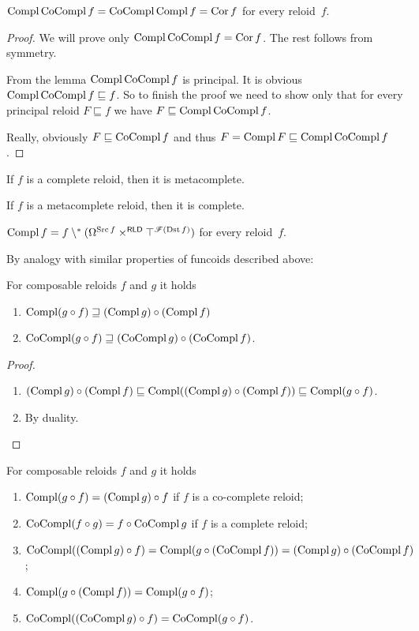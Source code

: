 \begin{thm}
$\operatorname{Compl}\operatorname{CoCompl} f=\operatorname{CoCompl}\operatorname{Compl} f=\operatorname{Cor} f$ for every reloid~$f$.\end{thm}
\begin{proof}
We will prove only $\operatorname{Compl}\operatorname{CoCompl} f=\operatorname{Cor} f$. The rest follows from
symmetry.

From the lemma $\operatorname{Compl}\operatorname{CoCompl} f$ is principal. It is obvious $\operatorname{Compl}\operatorname{CoCompl} f\sqsubseteq f$.
So to finish the proof we need to show only that for every principal
reloid $F\sqsubseteq f$ we have $F\sqsubseteq\operatorname{Compl}\operatorname{CoCompl} f$.

Really, obviously $F\sqsubseteq\operatorname{CoCompl} f$ and thus $F=\operatorname{Compl} F\sqsubseteq\operatorname{Compl}\operatorname{CoCompl} f$.\end{proof}
\begin{conjecture}\label{rld-compl-mcompl}
If $f$ is a complete reloid, then it is metacomplete.
\end{conjecture}

\begin{conjecture}
If $f$ is a metacomplete reloid, then it is complete.
\end{conjecture}

\begin{conjecture}
$\operatorname{Compl} f=f\setminus^{\ast}(\Omega^{\operatorname{Src} f}\times^{\mathsf{RLD}}\top^{\mathscr{F}(\operatorname{Dst} f)})$
for every reloid~$f$.
\end{conjecture}
By analogy with similar properties of funcoids described above:
\begin{prop}
For composable reloids $f$ and $g$ it holds
\begin{enumerate}
\item $\operatorname{Compl}(g\circ f)\sqsupseteq(\operatorname{Compl} g)\circ(\operatorname{Compl} f)$
\item $\operatorname{CoCompl}(g\circ f)\sqsupseteq(\operatorname{CoCompl} g)\circ(\operatorname{CoCompl} f)$.
\end{enumerate}
\end{prop}
\begin{proof}
~
\begin{enumerate}
\item $(\operatorname{Compl} g)\circ(\operatorname{Compl} f)\sqsubseteq\operatorname{Compl}((\operatorname{Compl} g)\circ(\operatorname{Compl} f))\sqsubseteq\operatorname{Compl}(g\circ f)$.
\item By duality.
\end{enumerate}
\end{proof}
\begin{conjecture}
For composable reloids $f$ and $g$ it holds
\begin{enumerate}
\item $\operatorname{Compl}(g\circ f)=(\operatorname{Compl} g)\circ f$ if $f$ is a co-complete reloid;
\item $\operatorname{CoCompl}(f\circ g)=f\circ\operatorname{CoCompl} g$ if $f$ is a complete reloid;
\item $\operatorname{CoCompl}((\operatorname{Compl} g)\circ f)=\operatorname{Compl}(g\circ(\operatorname{CoCompl} f))=(\operatorname{Compl} g)\circ(\operatorname{CoCompl} f)$;
\item $\operatorname{Compl}(g\circ(\operatorname{Compl} f))=\operatorname{Compl}(g\circ f)$;
\item $\operatorname{CoCompl}((\operatorname{CoCompl} g)\circ f)=\operatorname{CoCompl}(g\circ f)$.
\end{enumerate}
\end{conjecture}

